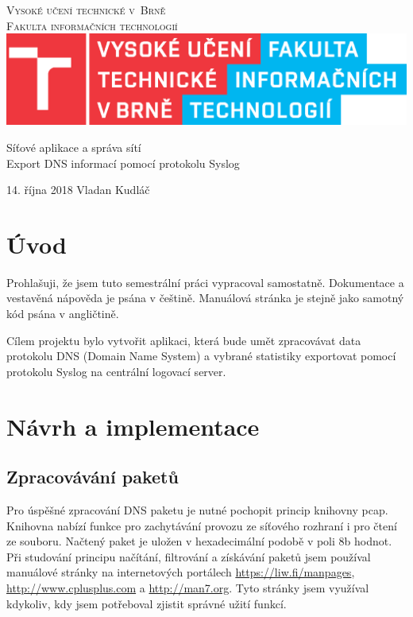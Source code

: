 \documentclass[11pt,a4paper]{article}
\author{Vladan Kudláč}
\begin{document}
\begin{titlepage}
\begin{center}
	\textsc{
		{\Huge Vysoké učení technické v~Brně} \\
		\medskip
		{\huge Fakulta informačních technologií} \\
	}
	\includegraphics{logoFIT.eps}
	
	{\LARGE Síťové aplikace a správa sítí} \\
	\medskip
	{\Huge Export DNS informací pomocí protokolu Syslog}
	
	{\Large 14. října 2018 \hfill Vladan Kudláč}
\end{center}
\end{titlepage}

\tableofcontents
\pagebreak

\section{Úvod}
Prohlašuji, že jsem tuto semestrální práci vypracoval samostatně. Dokumentace a vestavěná nápověda je psána v češtině. Manuálová stránka je stejně jako samotný kód psána v angličtině.

Cílem projektu bylo vytvořit aplikaci, která bude umět zpracovávat data protokolu DNS (Domain Name System) a vybrané statistiky exportovat pomocí protokolu Syslog na centrální logovací server.

\section{Návrh a implementace}
\subsection{Zpracovávání paketů}
Pro úspěšné zpracování DNS paketu je nutné pochopit princip knihovny pcap. Knihovna nabízí funkce pro zachytávání provozu ze síťového rozhraní i pro čtení ze souboru. Načtený paket je uložen v hexadecimální podobě v poli 8b hodnot. Při studování principu načítání, filtrování a získávání paketů jsem používal manuálové stránky na internetových portálech \url{https://liw.fi/manpages}, \url{http://www.cplusplus.com} a \url{http://man7.org}. Tyto stránky jsem využíval kdykoliv, kdy jsem potřeboval zjistit správné užití funkcí.
\end{document}
